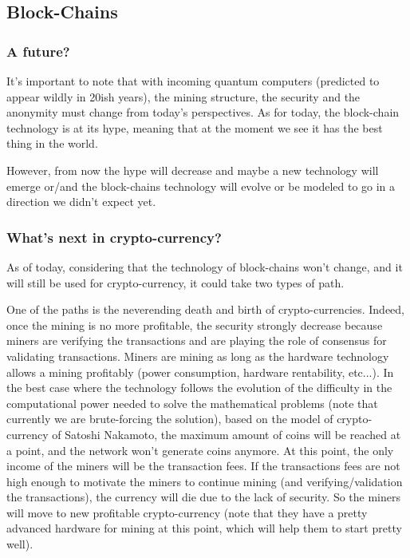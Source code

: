 
\subsection{Block-Chains}
\subsubsection{A future?}
It's important to note that with incoming quantum computers (predicted to appear wildly in 20ish years), the mining structure, the security and the anonymity must change from today's perspectives. 
As for today, the block-chain technology is at its hype, meaning that at the moment we see it has the best thing in the world.

However, from now the hype will decrease and maybe a new technology will emerge or/and the block-chains technology will evolve or be modeled to go in a direction we didn't expect yet.

\subsubsection{What's next in crypto-currency?}

As of today, considering that the technology of block-chains won't change, and it will still be used for crypto-currency, it could take two types of path.

One of the paths is the neverending death and birth of crypto-currencies. Indeed, once the mining is no more profitable, the security strongly decrease because miners are verifying the transactions and are playing the role of consensus for validating transactions. Miners are mining as long as the hardware technology allows a mining profitably (power consumption, hardware rentability, etc...). In the best case where the technology follows the evolution of the difficulty in the computational power needed to solve the mathematical problems (note that currently we are brute-forcing the solution), based on the model of crypto-currency of Satoshi Nakamoto, the maximum amount of coins will be reached at a point, and the network won't generate coins anymore. At this point, the only income of the miners will be the transaction fees. If the transactions fees are not high enough to motivate the miners to continue mining (and verifying/validation the transactions), the currency will die due to the lack of security. So the miners will move to new profitable crypto-currency (note that they have a pretty advanced hardware for mining at this point, which will help them to start pretty well).

